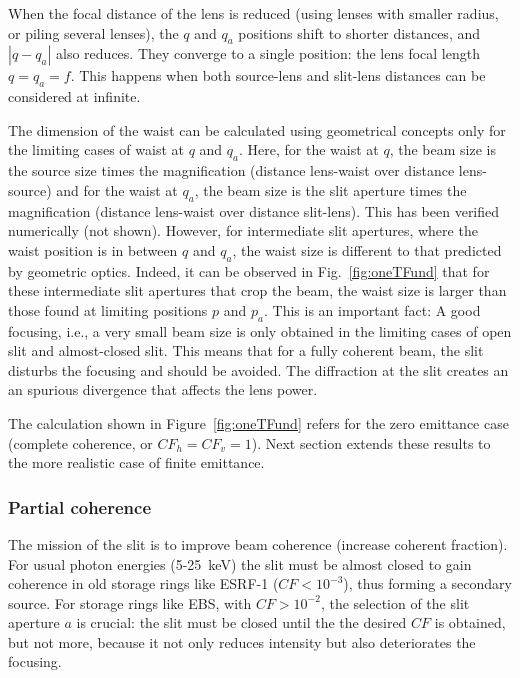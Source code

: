 \documentclass{iucr}              %
\begin{document}
When the focal distance of the lens is reduced (using lenses with smaller radius, or piling several lenses), the $q$ and $q_a$ positions shift to shorter distances, and  $|q-q_a|$ also reduces. They converge to a single position: the lens focal length $q=q_a=f$. This happens when both source-lens and slit-lens distances can be considered at infinite. 

The dimension of the waist can be calculated using geometrical concepts only for the limiting cases of waist at $q$ and $q_a$. Here, for the waist at $q$, the beam size is the source size times the magnification (distance lens-waist over distance lens-source) and for the waist at $q_a$, the beam size is the slit aperture times the magnification (distance lens-waist over distance slit-lens). This has been verified numerically (not shown). However, for intermediate slit apertures, where the waist position is in between $q$ and $q_a$, the waist size is different to that predicted by geometric optics.
Indeed, it can be observed in Fig.~\ref{fig:oneTFund} that for these intermediate slit apertures that crop the beam, the waist size is larger than those found at limiting positions $p$ and $p_a$.
This is an important fact: A good focusing, i.e., a very small beam size is only obtained in the limiting cases of open slit and almost-closed slit. This means that for a fully coherent beam, the slit disturbs the focusing and should be avoided. The diffraction at the slit creates an an spurious divergence that affects the lens power. 

The calculation shown in Figure~\ref{fig:oneTFund} refers for the zero emittance case (complete coherence, or $CF_h=CF_v=1$). Next section extends these results to the more realistic case of finite emittance.

\subsubsection{Partial coherence} The mission of the slit is to improve beam coherence (increase coherent fraction). For usual photon energies (5-25~keV)  the slit must be almost closed to gain coherence in old storage rings like ESRF-1 ($CF<10^{-3}$), thus forming a secondary source. For storage rings like EBS, with $CF > 10^{-2}$, the selection of the slit aperture $a$ is crucial: the slit must be closed until the the desired $CF$ is obtained, but not more, because it not only reduces intensity but also deteriorates the focusing. 
\end{document}
